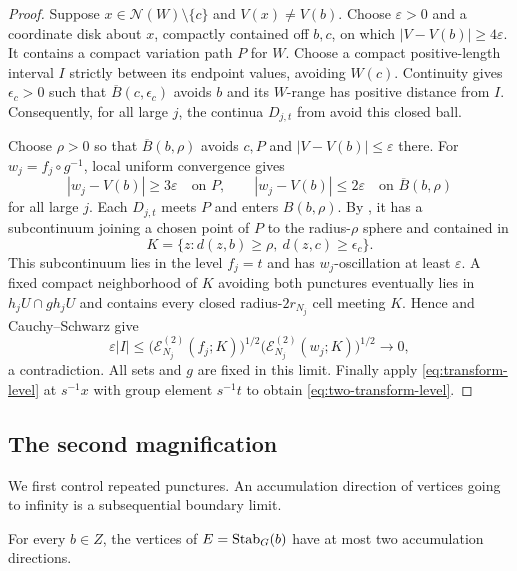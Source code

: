 \begin{proof}
Suppose $x\in\mathcal N(W)\setminus\{c\}$ and $V(x)\ne V(b)$.
Choose $\varepsilon>0$ and a coordinate disk about $x$, compactly
contained off $b,c$, on which $|V-V(b)|\ge4\varepsilon$.
It contains a compact variation path $P$ for $W$. Choose a compact
positive-length interval $I$ strictly between its endpoint values,
avoiding $W(c)$. Continuity gives $\epsilon_c>0$ such that
$\overline B(c,\epsilon_c)$ avoids $b$ and its $W$-range has positive
distance from $I$. Consequently, for all large $j$, the continua
$D_{j,t}$ from  avoid this closed ball.

Choose $\rho>0$ so that $\overline B(b,\rho)$ avoids $c,P$ and
$|V-V(b)|\le\varepsilon$ there. For $w_j=f_j\circ g^{-1}$,
local uniform convergence gives
\[
 |w_j-V(b)|\ge3\varepsilon\quad\text{on }P,
 \qquad |w_j-V(b)|\le2\varepsilon\quad\text{on }\overline B(b,\rho)
\]
for all large $j$. Each $D_{j,t}$ meets $P$ and enters $B(b,\rho)$.
By , it has a subcontinuum joining a chosen
point of $P$ to the radius-$\rho$ sphere and contained in
\[
 K=\{z:d(z,b)\ge\rho,\ d(z,c)\ge\epsilon_c\}.
\]
This subcontinuum lies in the level $f_j=t$ and has $w_j$-oscillation
at least $\varepsilon$. A fixed compact neighborhood of $K$ avoiding
both punctures eventually lies in $h_jU\cap gh_jU$ and contains every
closed radius-$2r_{N_j}$ cell meeting $K$. Hence
 and Cauchy--Schwarz give
\[
 \varepsilon|I|\le
 \bigl(\mathcal E_{N_j}^{(2)}(f_j;K)\bigr)^{1/2}
 \bigl(\mathcal E_{N_j}^{(2)}(w_j;K)\bigr)^{1/2}\longrightarrow0,
\]
a contradiction. All sets and $g$ are fixed in this limit.
Finally apply \eqref{eq:transform-level} at $s^{-1}x$ with group
element $s^{-1}t$ to obtain \eqref{eq:two-transform-level}.
\end{proof}

\subsection{The second magnification}

We first control repeated punctures. An accumulation direction of
vertices going to infinity is a subsequential boundary limit.

\begin{lemma}
\label{lem:stabilizer}
For every $b\in Z$, the vertices of $E=\operatorname{Stab}_G(b)$ have at most
two accumulation directions.
\end{lemma}

